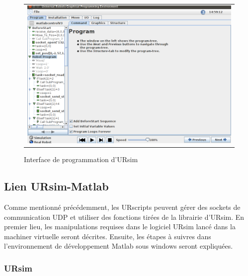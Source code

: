 \begin{figure}
 \begin{center}
  \begin{tabular}{c}
    \includegraphics[trim=0cm 0cm 0cm 0cm, scale=0.35]{screenshots_tuto_ursim/interface_prog.png}
  \end{tabular}
 \end{center}
\caption{Interface de programmation d'URsim}
 \label{fig:ui_programmation}
\end{figure}



\subsection{Lien URsim-Matlab}
Comme mentionné précédemment, les URscripts peuvent gérer des sockets de communication UDP et utiliser des fonctions tirées de la librairie d'URsim. 
En premier lieu, les manipulations requises dans le logiciel URsim lancé dans la machiner virtuelle seront décrites.
Ensuite, les étapes à suivres dans l'environnement de développement Matlab sous windows seront expliquées.

\subsubsection{URsim}

